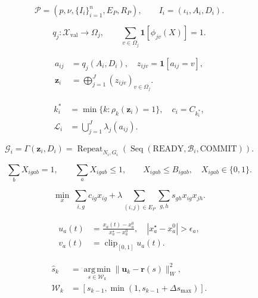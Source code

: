 \begin{equation}
\mathcal{P}=(p,\nu,\{I_i\}_{i=1}^{n},E_P,R_P),\qquad I_i=(\iota_i,A_i,D_i).
\tag{1}
\end{equation}

\begin{equation}
q_j:\mathcal{X}_{\mathrm{val}}\to\Omega_j,\qquad \sum_{v\in\Omega_j}\mathbf{1}[\phi_{jv}(X)]=1.
\tag{2}
\end{equation}

\begin{equation}
\begin{aligned}a_{ij}&=q_j(A_i,D_i),\quad z_{ijv}=\mathbf{1}[a_{ij}=v],\\\mathbf z_i&=\bigoplus_{j=1}^{J}(z_{ijv})_{v\in\Omega_j}.\end{aligned}
\tag{3}
\end{equation}

\begin{equation}
\begin{aligned}k_i^*&=\min\{k:\rho_k(\mathbf z_i)=1\},\quad c_i=C_{k_i^*},\\\mathcal L_i&=\bigcup_{j=1}^{J}\lambda_j(a_{ij}).\end{aligned}
\tag{4}
\end{equation}

\begin{equation}
\mathcal G_i=\Gamma(\mathbf z_i,D_i)=\operatorname{Repeat}_{N_i,G_i}\!\left(\operatorname{Seq}(\mathrm{READY},\mathcal B_i,\mathrm{COMMIT})\right).
\tag{5}
\end{equation}

\begin{equation}
\sum_b X_{igab}=1,\qquad \sum_a X_{igab}\leq1,\qquad X_{igab}\leq B_{igab},\quad X_{igab}\in\{0,1\}.
\tag{6}
\end{equation}

\begin{equation}
\min_{x}\ \sum_{i,g}c_{ig}x_{ig}+\lambda\!\sum_{(i,j)\in E_P}\sum_{g,h}s_{gh}x_{ig}x_{jh}.
\tag{7}
\end{equation}

\begin{equation}
\begin{aligned}u_a(t)&=\frac{x_a(t)-x_a^0}{x_a^\star-x_a^0},\quad |x_a^\star-x_a^0|>\epsilon_a,\\v_a(t)&=\operatorname{clip}_{[0,1]}u_a(t).\end{aligned}
\tag{8}
\end{equation}

\begin{equation}
\begin{aligned}\hat s_k&=\operatorname*{arg\,min}_{s\in\mathcal W_k}\|\mathbf u_k-\mathbf r(s)\|_W^2,\\\mathcal W_k&=[s_{k-1},\min(1,s_{k-1}+\Delta s_{\max})].\end{aligned}
\tag{9}
\end{equation}


